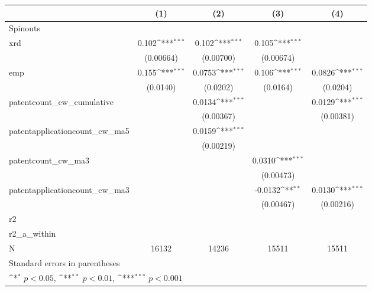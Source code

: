 {
\def\sym#1{\ifmmode^{#1}\else\(^{#1}\)\fi}
\begin{tabular}{l*{4}{c}}
\hline\hline
            &\multicolumn{1}{c}{(1)}         &\multicolumn{1}{c}{(2)}         &\multicolumn{1}{c}{(3)}         &\multicolumn{1}{c}{(4)}         \\
\hline
Spinouts    &                     &                     &                     &                     \\
xrd         &       0.102\sym{***}&       0.102\sym{***}&       0.105\sym{***}&                     \\
            &   (0.00664)         &   (0.00700)         &   (0.00674)         &                     \\
[1em]
emp         &       0.155\sym{***}&      0.0753\sym{***}&       0.106\sym{***}&      0.0826\sym{***}\\
            &    (0.0140)         &    (0.0202)         &    (0.0164)         &    (0.0204)         \\
[1em]
patentcount\_cw\_cumulative&                     &      0.0134\sym{***}&                     &      0.0129\sym{***}\\
            &                     &   (0.00367)         &                     &   (0.00381)         \\
[1em]
patentapplicationcount\_cw\_ma5&                     &      0.0159\sym{***}&                     &                     \\
            &                     &   (0.00219)         &                     &                     \\
[1em]
patentcount\_cw\_ma3&                     &                     &      0.0310\sym{***}&                     \\
            &                     &                     &   (0.00473)         &                     \\
[1em]
patentapplicationcount\_cw\_ma3&                     &                     &     -0.0132\sym{**} &      0.0130\sym{***}\\
            &                     &                     &   (0.00467)         &   (0.00216)         \\
\hline
r2          &                     &                     &                     &                     \\
r2\_a\_within &                     &                     &                     &                     \\
N           &       16132         &       14236         &       15511         &       15511         \\
\hline\hline
\multicolumn{5}{l}{\footnotesize Standard errors in parentheses}\\
\multicolumn{5}{l}{\footnotesize \sym{*} \(p<0.05\), \sym{**} \(p<0.01\), \sym{***} \(p<0.001\)}\\
\end{tabular}
}
